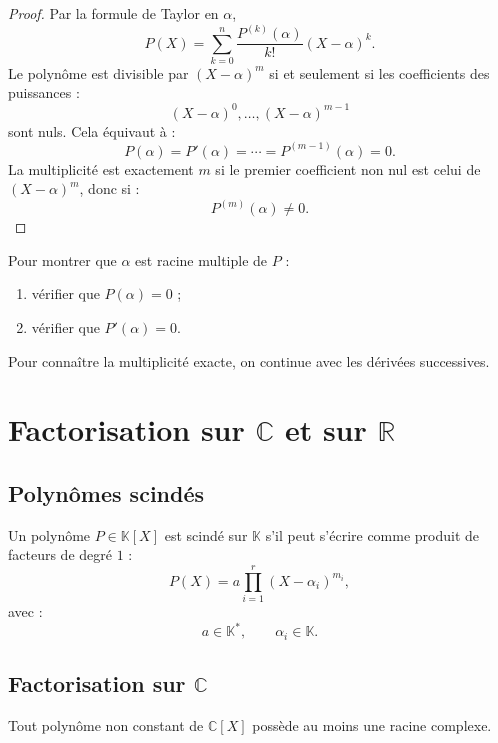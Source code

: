 \documentclass[11pt,a4paper]{article}
\newcommand{\K}{\mathbb K}
\newcommand{\R}{\mathbb R}
\newcommand{\C}{\mathbb C}
\begin{document}
\begin{proof}
Par la formule de Taylor en \(\alpha\),
\[
P(X)=\sum_{k=0}^{n}
\frac{P^{(k)}(\alpha)}{k!}(X-\alpha)^k.
\]
Le polynôme est divisible par \((X-\alpha)^m\) si et seulement si les coefficients des puissances :
\[
(X-\alpha)^0,\dots,(X-\alpha)^{m-1}
\]
sont nuls.  
Cela équivaut à :
\[
P(\alpha)=P'(\alpha)=\cdots=P^{(m-1)}(\alpha)=0.
\]
La multiplicité est exactement \(m\) si le premier coefficient non nul est celui de \((X-\alpha)^m\), donc si :
\[
P^{(m)}(\alpha)\neq0.
\]
\end{proof}

\begin{methodbox}
Pour montrer que \(\alpha\) est racine multiple de \(P\) :
\begin{enumerate}
    \item vérifier que \(P(\alpha)=0\) ;
    \item vérifier que \(P'(\alpha)=0\).
\end{enumerate}
Pour connaître la multiplicité exacte, on continue avec les dérivées successives.
\end{methodbox}

\section{Factorisation sur \(\C\) et sur \(\R\)}

\subsection{Polynômes scindés}

\begin{definitionbox}
Un polynôme \(P\in\K[X]\) est scindé sur \(\K\) s'il peut s'écrire comme produit de facteurs de degré \(1\) :
\[
P(X)=a\prod_{i=1}^r(X-\alpha_i)^{m_i},
\]
avec :
\[
a\in\K^*,
\qquad
\alpha_i\in\K.
\]
\end{definitionbox}

\subsection{Factorisation sur \(\C\)}

\begin{theorembox}
Tout polynôme non constant de \(\C[X]\) possède au moins une racine complexe.
\end{theorembox}
\end{document}
